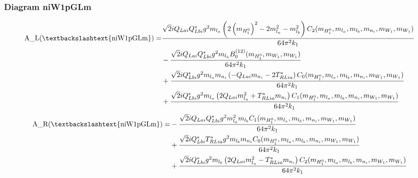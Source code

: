 \documentclass{article}
\begin{document}
\subsubsection{Diagram niW1pGLm}
\begin{align*}
\mathtt{\text{A\_L(\textbackslashtext\{niW1pGLm\})}} = & \frac{\sqrt{2} i Q_{Lai} Q_{Lbi}^* g^{2} m_{l_a} \left(2 \left(m_{H_1^0}\right)^{2} - 2 m_{l_a}^{2} - m_{l_b}^{2}\right) C_2(m_{H_1^0}, m_{l_a}, m_{l_b}, m_{n_i}, m_{W_1}, m_{W_1})}{64 \pi^{2} k_{1}} \\
& - \frac{\sqrt{2} i Q_{Lai} Q_{Lbi}^* g^{2} m_{l_a} B^{\left(12\right)}_0(m_{H_1^0}, m_{W_1}, m_{W_1})}{64 \pi^{2} k_{1}} \\
& + \frac{\sqrt{2} i Q_{Lbi}^* g^{2} m_{l_a} m_{n_i} \left(- Q_{Lai} m_{n_i} - 2 T_{RLia}^*\right) C_0(m_{H_1^0}, m_{l_a}, m_{l_b}, m_{n_i}, m_{W_1}, m_{W_1})}{64 \pi^{2} k_{1}} \\
& + \frac{\sqrt{2} i Q_{Lbi}^* g^{2} m_{l_a} \left(2 Q_{Lai} m_{l_a}^{2} + T_{RLia}^* m_{n_i}\right) C_1(m_{H_1^0}, m_{l_a}, m_{l_b}, m_{n_i}, m_{W_1}, m_{W_1})}{64 \pi^{2} k_{1}} 
\end{align*}
\begin{align*}
\mathtt{\text{A\_R(\textbackslashtext\{niW1pGLm\})}} = &- \frac{\sqrt{2} i Q_{Lai} Q_{Lbi}^* g^{2} m_{l_a}^{2} m_{l_b} C_1(m_{H_1^0}, m_{l_a}, m_{l_b}, m_{n_i}, m_{W_1}, m_{W_1})}{64 \pi^{2} k_{1}} \\
& + \frac{\sqrt{2} i Q_{Lbi}^* T_{RLia}^* g^{2} m_{l_b} m_{n_i} C_0(m_{H_1^0}, m_{l_a}, m_{l_b}, m_{n_i}, m_{W_1}, m_{W_1})}{64 \pi^{2} k_{1}} \\
& + \frac{\sqrt{2} i Q_{Lbi}^* g^{2} m_{l_b} \left(2 Q_{Lai} m_{l_a}^{2} - T_{RLia}^* m_{n_i}\right) C_2(m_{H_1^0}, m_{l_a}, m_{l_b}, m_{n_i}, m_{W_1}, m_{W_1})}{64 \pi^{2} k_{1}} 
\end{align*}
\end{document}
